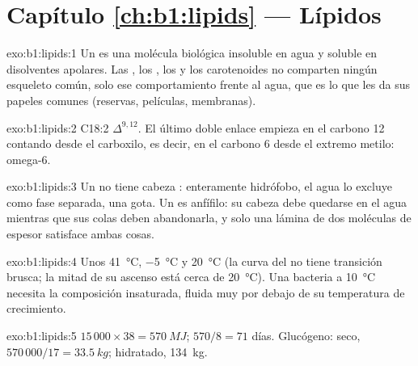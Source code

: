 \section*{Capítulo \ref{ch:b1:lipids} --- Lípidos}

\begin{solution}{exo:b1:lipids:1}
Un  es una molécula biológica insoluble en agua y soluble en
disolventes apolares. Las , los , los  y los
carotenoides no comparten ningún esqueleto común, solo ese comportamiento
frente al agua, que es lo que les da sus papeles comunes (reservas,
películas, membranas).
\end{solution}

\begin{solution}{exo:b1:lipids:2}
C18:2 $\Delta^{9,12}$. El último doble enlace empieza en el carbono 12
contando desde el carboxilo, es decir, en el carbono 6 desde el extremo
metilo: omega-6.
\end{solution}

\begin{solution}{exo:b1:lipids:3}
Un  no tiene cabeza : enteramente hidrófobo, el agua lo
excluye como fase separada, una gota. Un  es anfífilo: su cabeza
 debe quedarse en el agua mientras que sus colas deben abandonarla, y
solo una lámina de dos moléculas de espesor satisface ambas cosas.
\end{solution}

\begin{solution}{exo:b1:lipids:4}
Unos \qty{41}{\celsius}, \qty{-5}{\celsius} y \qty{20}{\celsius} (la curva
del  no tiene transición brusca; la mitad de su ascenso está cerca
de \qty{20}{\celsius}). Una bacteria a \qty{10}{\celsius} necesita la
composición insaturada, fluida muy por debajo de su temperatura de
crecimiento.
\end{solution}

\begin{solution}{exo:b1:lipids:5}
$15\,000\times 38 = \qty{570}{MJ}$; $570/8 = 71$ días. Glucógeno: seco,
$570\,000/17 = \qty{33.5}{kg}$; hidratado, \qty{134}{kg}.
\end{solution}


